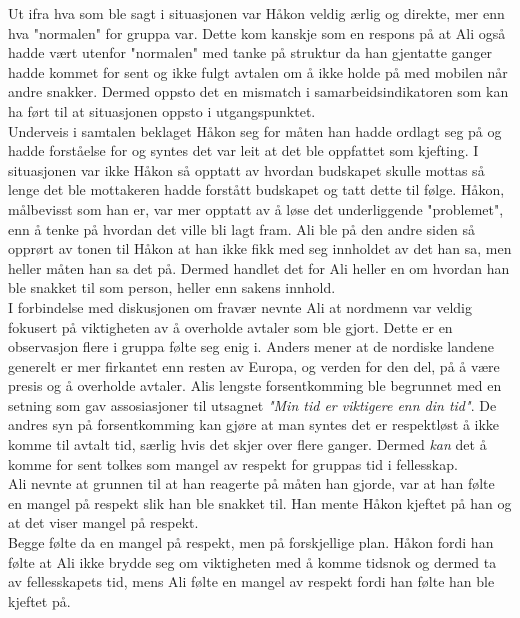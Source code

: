 \newpage

 Ut ifra hva som ble sagt i situasjonen var Håkon veldig ærlig og direkte, mer enn hva "normalen" for gruppa var. Dette kom kanskje som en respons på at Ali også hadde vært utenfor "normalen" med tanke på struktur da han gjentatte ganger hadde kommet for sent og ikke fulgt avtalen om å ikke holde på med mobilen når andre snakker. Dermed oppsto det en mismatch i samarbeidsindikatoren som kan ha ført til at situasjonen oppsto i utgangspunktet. \\

 Underveis i samtalen beklaget Håkon seg for måten han hadde ordlagt seg på og hadde forståelse for og syntes det var leit at det ble oppfattet som kjefting. I situasjonen var ikke Håkon så opptatt av hvordan budskapet skulle mottas så lenge det ble mottakeren hadde forstått budskapet og tatt dette til følge. Håkon, målbevisst som han er, var mer opptatt av å løse det underliggende "problemet", enn å tenke på hvordan det ville bli lagt fram. Ali ble på den andre siden så opprørt av tonen til Håkon at han ikke fikk med seg innholdet av det han sa, men heller måten han sa det på. Dermed handlet det for Ali heller en om hvordan han ble snakket til som person, heller enn sakens innhold.\\
 
 I forbindelse med diskusjonen om fravær nevnte Ali at nordmenn var veldig fokusert på viktigheten av å overholde avtaler som ble gjort. Dette er en observasjon flere i gruppa følte seg enig i. Anders mener at de nordiske landene generelt er mer firkantet enn resten av Europa, og verden for den del, på å være presis og å overholde avtaler. Alis lengste forsentkomming ble begrunnet med en setning som gav assosiasjoner til utsagnet \textit{"Min tid er viktigere enn din tid"}. De andres syn på forsentkomming kan gjøre at man syntes det er respektløst å ikke komme til avtalt tid, særlig hvis det skjer over flere ganger. Dermed \textit{kan} det å komme for sent tolkes som mangel av respekt for gruppas tid i fellesskap.\\
 Ali nevnte at grunnen til at han reagerte på måten han gjorde, var at han følte en mangel på respekt slik han ble snakket til. Han mente Håkon kjeftet på han og at det viser mangel på respekt.\\
 
 Begge følte da en mangel på respekt, men på forskjellige plan. Håkon fordi han følte at Ali ikke brydde seg om viktigheten med å komme tidsnok og dermed ta av fellesskapets tid, mens Ali følte en mangel av respekt fordi han følte han ble kjeftet på. \\
 
